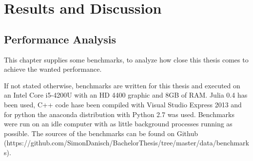 \section{Results and Discussion}

\subsection{Performance Analysis}
This chapter supplies some benchmarks, to analyze how close this thesis comes to achieve the wanted performance.

If not stated otherwise, benchmarks are written for this thesis and executed on an Intel Core i5-4200U with an HD 4400 graphic and 8GB of RAM.
Julia 0.4 has been used, C++ code hase been compiled with Visual Studio Express 2013 and for python the anaconda distribution with Python 2.7 was used.
Benchmarks were run on an idle computer with as little background processes running as possible.
The sources of the benchmarks can be found on Github (https://github.com/SimonDanisch/BachelorThesis/tree/master/data/benchmarks).

